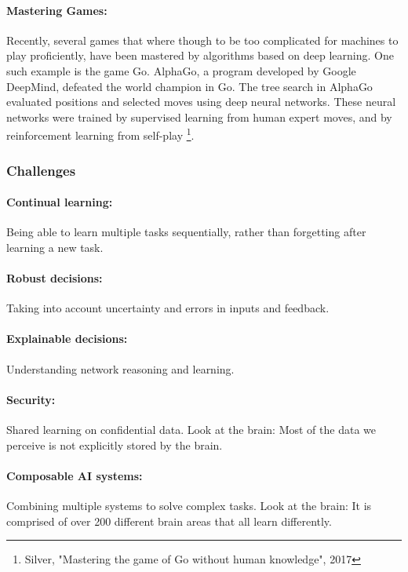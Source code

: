 \documentclass[main]{subfiles}
\begin{document}
\paragraph{Mastering Games:} 
Recently, several games that where though to be too complicated for machines to play proficiently, have been mastered by algorithms based on deep learning. One such example is the game Go. AlphaGo, a program developed by Google DeepMind, defeated the world champion in Go. The tree search in AlphaGo evaluated positions and selected moves using deep neural networks. These neural networks were trained by supervised learning from human expert moves, and by reinforcement learning from self-play \footnote{Silver, "Mastering the game of Go without human knowledge", 2017}.

\subsubsection{Challenges}

\paragraph{Continual learning:}
Being able to learn multiple tasks sequentially, rather than forgetting after learning a new task.
\paragraph{Robust decisions:}
Taking into account uncertainty and errors in inputs and feedback.
\paragraph{Explainable decisions:}
Understanding network reasoning and learning.
\paragraph{Security:}
Shared learning on confidential data. Look at the brain: Most of the data we perceive is not explicitly stored by the brain. 
\paragraph{Composable AI systems:}
Combining multiple systems to solve complex tasks. Look at the brain: It is comprised of over 200 different brain areas that all learn differently. 
\end{document}
